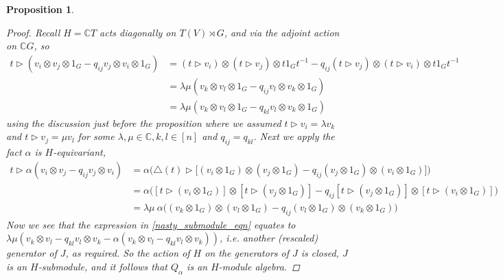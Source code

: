 \documentclass[10pt]{article}
\newcommand{\nt}{\noindent}
\newcommand{\Cc }{\mathbb{C}}
\newtheorem{proposition}[lemma]{Proposition}
\theoremstyle{definition}
\begin{document}
\begin{proposition}
\begin{proof}
\nt Recall $H=\Cc  T$ acts diagonally on $T(V)\rtimes G$, and via the adjoint action on $\Cc  G$, so 
\begin{align*}
t \rhd (v_i\otimes v_j\otimes 1_G-q_{ij}v_j\otimes v_i\otimes 1_G) & = (t\rhd v_i)\otimes (t\rhd v_j)\otimes t1_Gt^{-1} -q_{ij}(t\rhd v_j)\otimes (t\rhd v_i)\otimes t1_Gt^{-1}\\
& = \lambda\mu (v_k\otimes v_l\otimes 1_G-q_{ij}v_l\otimes v_k\otimes 1_G)\\
& = \lambda\mu (v_k\otimes v_l\otimes 1_G-q_{kl}v_l\otimes v_k\otimes 1_G)
\end{align*}
using the discussion just before the proposition where we assumed $t\rhd v_i=\lambda v_k$ and $t\rhd v_j=\mu v_l$ for some $\lambda,\mu\in \Cc , k,l\in [n]$ and $q_{ij}=q_{kl}$. %
Next we apply the fact $\alpha$ is $H$-equivariant,
\begin{align*}
t\rhd \alpha(v_i\otimes v_j-q_{ij}v_j\otimes v_i) & =\alpha\Big(\triangle(t)\rhd \big[(v_i\otimes 1_G)\otimes (v_j\otimes 1_G)-q_{ij}(v_j\otimes 1_G)\otimes (v_i\otimes 1_G)\big]\Big)\\
& = \alpha\Big([t\rhd (v_i\otimes 1_G)]\otimes [t\rhd (v_j\otimes 1_G)]-q_{ij}[t\rhd (v_j\otimes 1_G)]\otimes [t\rhd (v_i\otimes 1_G)]\Big)\\
& = \lambda\mu\ \alpha\Big((v_k\otimes 1_G)\otimes (v_l\otimes 1_G)-q_{ij}(v_l\otimes 1_G)\otimes (v_k\otimes 1_G)\Big)
\end{align*}
Now we see that the expression in \eqref{nasty_submodule_eqn} equates to $\lambda\mu(v_k\otimes v_l-q_{kl}v_l\otimes v_k-\alpha(v_k\otimes v_l-q_{kl}v_l\otimes v_k))$, i.e. another (rescaled) generator of $J$, as required. So the action of $H$ on the generators of $J$ is closed, $J$ is an $H$-submodule, and it follows that $Q_\alpha$ is an $H$-module algebra.
\end{proof}
\end{proposition}


\end{document}
